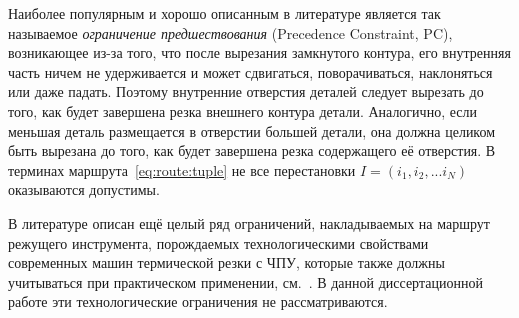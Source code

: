 Наиболее популярным и хорошо описанным в литературе
является так называемое
{\it ограничение предшествования}
(Precedence Constraint, PC),
возникающее из-за того,
что
после вырезания замкнутого контура,
его внутренняя часть ничем не удерживается
и может сдвигаться, поворачиваться, наклоняться
или даже падать.
Поэтому внутренние отверстия деталей следует
вырезать до того,
как будет завершена резка
внешнего контура детали.
Аналогично,
если меньшая деталь размещается
в отверстии большей детали,
она должна целиком быть вырезана
до того,
как будет завершена резка
содержащего её отверстия.
В терминах маршрута~\eqref{eq:route:tuple}
не все перестановки
$I = (i_1, i_2, ... i_N)$
оказываются допустимы.

В литературе описан
ещё целый ряд ограничений,
накладываемых на маршрут режущего инструмента,
порождаемых
технологическими свойствами
современных машин термической резки с ЧПУ,
которые также должны учитываться
при практическом применении,
см.~\cite{Sozopol,Miskolc}.
В данной диссертационной работе
эти технологические ограничения не рассматриваются.
